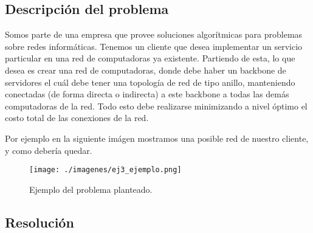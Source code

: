 \subsection{Descripci\'on del problema}

Somos parte de una empresa que provee soluciones algorítmicas para problemas sobre redes informáticas. Tenemos un cliente que desea implementar un servicio particular en una red de computadoras ya existente.
Partiendo de esta, lo que desea es crear una red de computadoras, donde debe haber un backbone de servidores el cuál debe tener una topología de red de tipo anillo, manteniendo conectadas (de forma directa o indirecta) a este backbone a todas las demás computadoras de la red.
Todo esto debe realizarse minimizando a nivel óptimo el costo total de las conexiones de la red.

Por ejemplo en la siguiente imágen mostramos una posible red de nuestro cliente, y como debería quedar.

\begin{figure}[H]
\begin{center}
\texttt{[image: ./imagenes/ej3\_ejemplo.png]}
\caption{Ejemplo del problema planteado.}
\end{center}
\end{figure}


\newpage


\subsection{Resoluci\'on}

